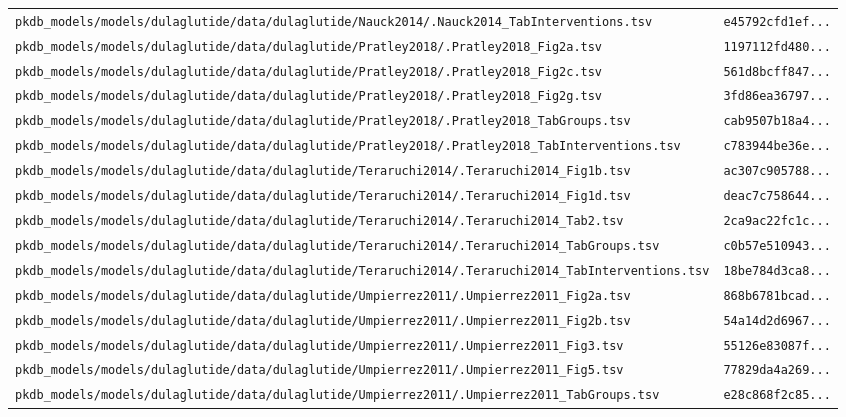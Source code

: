 \begin{longtable}{ll}
\texttt{pkdb\_models/models/dulaglutide/data/dulaglutide/Nauck2014/.Nauck2014\_TabInterventions.tsv} & \texttt{e45792cfd1ef...} \\
\texttt{pkdb\_models/models/dulaglutide/data/dulaglutide/Pratley2018/.Pratley2018\_Fig2a.tsv} & \texttt{1197112fd480...} \\
\texttt{pkdb\_models/models/dulaglutide/data/dulaglutide/Pratley2018/.Pratley2018\_Fig2c.tsv} & \texttt{561d8bcff847...} \\
\texttt{pkdb\_models/models/dulaglutide/data/dulaglutide/Pratley2018/.Pratley2018\_Fig2g.tsv} & \texttt{3fd86ea36797...} \\
\texttt{pkdb\_models/models/dulaglutide/data/dulaglutide/Pratley2018/.Pratley2018\_TabGroups.tsv} & \texttt{cab9507b18a4...} \\
\texttt{pkdb\_models/models/dulaglutide/data/dulaglutide/Pratley2018/.Pratley2018\_TabInterventions.tsv} & \texttt{c783944be36e...} \\
\texttt{pkdb\_models/models/dulaglutide/data/dulaglutide/Teraruchi2014/.Teraruchi2014\_Fig1b.tsv} & \texttt{ac307c905788...} \\
\texttt{pkdb\_models/models/dulaglutide/data/dulaglutide/Teraruchi2014/.Teraruchi2014\_Fig1d.tsv} & \texttt{deac7c758644...} \\
\texttt{pkdb\_models/models/dulaglutide/data/dulaglutide/Teraruchi2014/.Teraruchi2014\_Tab2.tsv} & \texttt{2ca9ac22fc1c...} \\
\texttt{pkdb\_models/models/dulaglutide/data/dulaglutide/Teraruchi2014/.Teraruchi2014\_TabGroups.tsv} & \texttt{c0b57e510943...} \\
\texttt{pkdb\_models/models/dulaglutide/data/dulaglutide/Teraruchi2014/.Teraruchi2014\_TabInterventions.tsv} & \texttt{18be784d3ca8...} \\
\texttt{pkdb\_models/models/dulaglutide/data/dulaglutide/Umpierrez2011/.Umpierrez2011\_Fig2a.tsv} & \texttt{868b6781bcad...} \\
\texttt{pkdb\_models/models/dulaglutide/data/dulaglutide/Umpierrez2011/.Umpierrez2011\_Fig2b.tsv} & \texttt{54a14d2d6967...} \\
\texttt{pkdb\_models/models/dulaglutide/data/dulaglutide/Umpierrez2011/.Umpierrez2011\_Fig3.tsv} & \texttt{55126e83087f...} \\
\texttt{pkdb\_models/models/dulaglutide/data/dulaglutide/Umpierrez2011/.Umpierrez2011\_Fig5.tsv} & \texttt{77829da4a269...} \\
\texttt{pkdb\_models/models/dulaglutide/data/dulaglutide/Umpierrez2011/.Umpierrez2011\_TabGroups.tsv} & \texttt{e28c868f2c85...} \\

\end{longtable}
